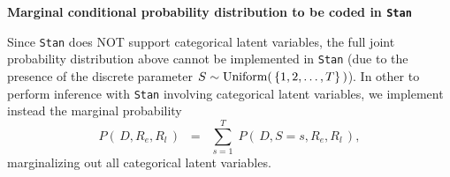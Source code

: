
\vskip 1.0cm
\noindent
\begin{center}
\textbf{\large Marginal conditional probability distribution to be coded in \texttt{Stan}}
\end{center}
\vskip 0.3cm
\noindent
Since \texttt{Stan} does NOT support categorical latent variables,
the full joint probability distribution above cannot be implemented in \texttt{Stan}
(due to the presence of the discrete parameter $S \sim \textnormal{Uniform}\!\left(\,\{1,2,\ldots,T\}\,\right)$).
In other to perform inference with \texttt{Stan} involving categorical latent variables,
we implement instead the {\color{red}marginal probability}
\begin{equation*}
P\!\left(\,D,R_{e},R_{l}\,\right)
\;\; = \;\;
	\overset{T}{\underset{s=1}{\sum}}\;
	P\!\left(\,D,S=s,R_{e},R_{l}\,\right),
\end{equation*}
marginalizing out all categorical latent variables.

